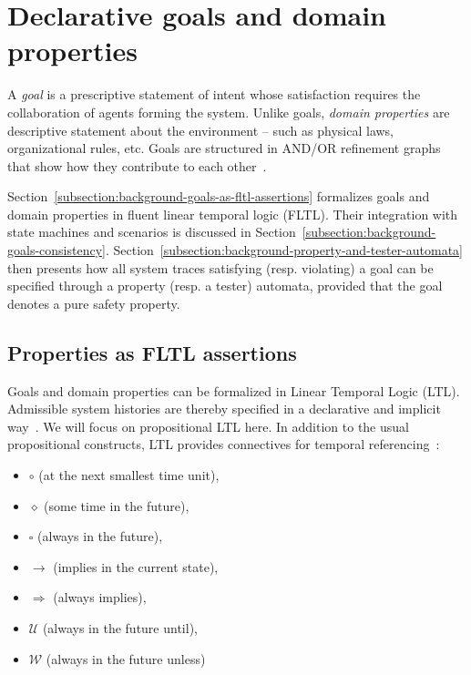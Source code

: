 \section{Declarative goals and domain properties\label{section:background-goals}}

A \emph{goal} is a prescriptive statement of intent whose satisfaction requires the collaboration of agents forming the system. Unlike goals, \emph{domain properties} are descriptive statement about the environment -- such as physical laws, organizational rules, etc. Goals are structured in AND/OR refinement graphs that show how they contribute to each other~\cite{VanLamsweerde:2000}.

Section~\ref{subsection:background-goals-as-fltl-assertions} formalizes goals and domain properties in fluent linear temporal logic (FLTL). Their integration with state machines and scenarios is discussed in Section~\ref{subsection:background-goals-consistency}. Section~\ref{subsection:background-property-and-tester-automata} then presents how all system traces satisfying (resp. violating) a goal can be specified through a property (resp. a tester) automata, provided that the goal denotes a pure safety property.

\subsection{Properties as FLTL assertions\label{subsection:background-goals-as-fltl-assertions}}

Goals and domain properties can be formalized in Linear Temporal Logic (LTL). Admissible system histories are thereby specified in a declarative and implicit way~\cite{VanLamsweerde:2009}. We will focus on propositional LTL here. In addition to the usual propositional constructs, LTL provides connectives for temporal referencing~\cite{Manna:1992}: 

\begin{itemize}
\item $\circ$ (at the next smallest time unit), 
\item $\diamond$ (some time in the future), 
\item $\square$ (always in the future), 
\item $\rightarrow$ (implies in the current state), 
\item $\Rightarrow$ (always implies), 
\item $\mathcal{U}$ (always in the future until), 
\item $\mathcal{W}$ (always in the future unless)
\end{itemize}

